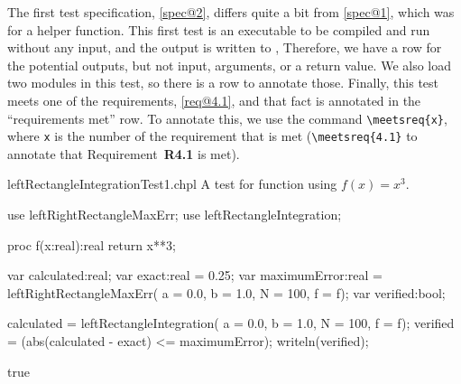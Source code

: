  \begin{seamlessnote}
    The first test specification, \ref{spec@2}, differs quite a bit from \ref{spec@1}, which was
    for a helper function. This first test is an executable to be compiled and run without any 
    input, and the output is written to , Therefore, we have a row for the 
    potential outputs, but not input, arguments, or a return value. We also load two modules
    in this test, so there is a row to annotate those.  Finally, this test meets one of the
    requirements, \ref{req@4.1}, and that fact is annotated in the ``requirements met'' row.
    To annotate this, we use the command \verb|\meetsreq{x}|, where \verb|x| is the number of the
    requirement that is met (\eg \verb|\meetsreq{4.1}| to annotate that Requirement~\textbf{R4.1}
    is met).
  \end{seamlessnote}

  \begin{chapelexample}{leftRectangleIntegrationTest1.chpl}
    A test for function  using $f(x) = x^3$.
    \begin{chapelpre}
    \end{chapelpre}
    \begin{chapel}
use leftRightRectangleMaxErr;
use leftRectangleIntegration;

proc f(x:real):real {
  return x**3;
} 

var calculated:real;
var exact:real = 0.25;
var maximumError:real = leftRightRectangleMaxErr(
  a = 0.0, b = 1.0, N = 100, f = f);
var verified:bool;

calculated = leftRectangleIntegration(
  a = 0.0, b = 1.0, N = 100, f = f);
verified = (abs(calculated - exact) <= maximumError);
writeln(verified);
    \end{chapel}
    \begin{chapelpost}
    \end{chapelpost}
    \begin{chapeloutput}
true
    \end{chapeloutput}
  \end{chapelexample}

